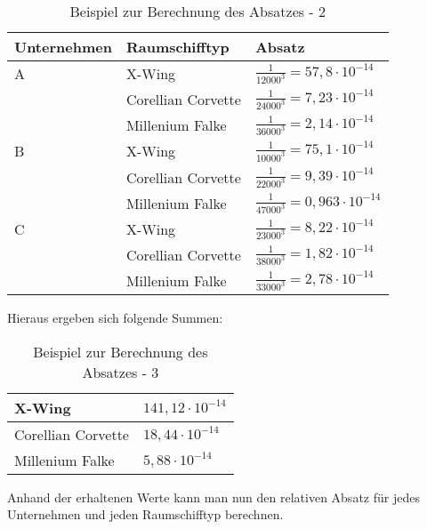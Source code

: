 \begin{table}[htb]
     \centering
     \begin{tabular}{ | l | l | l | }
          \hline
          Unternehmen & Raumschifftyp & Absatz \\
          \hline \hline
         A & X-Wing & $\frac{1}{12000^3} = 57,8 \cdot 10^{-14}$  \\
           & Corellian Corvette & $\frac{1}{24000^3} = 7,23 \cdot 10^{-14}$ \\
           & Millenium Falke & $\frac{1}{36000^3} = 2,14 \cdot 10^{-14}$ \\ \hline
         B & X-Wing & $\frac{1}{10000^3} = 75,1 \cdot 10^{-14}$ \\
           & Corellian Corvette & $\frac{1}{22000^3} = 9,39 \cdot 10^{-14}$ \\
           & Millenium Falke & $\frac{1}{47000^3} = 0,963 \cdot 10^{-14}$ \\ \hline
         C & X-Wing & $\frac{1}{23000^3} = 8,22 \cdot 10^{-14}$ \\
           & Corellian Corvette & $\frac{1}{38000^3} = 1,82 \cdot 10^{-14}$ \\
           & Millenium Falke & $\frac{1}{33000^3} = 2,78 \cdot 10^{-14}$ \\ \hline
     \end{tabular}
     \caption{Beispiel zur Berechnung des Absatzes - 2}
     \label{tab:spielwelt-logik-absatzmengen-beispiel2}
\end{table}
 
 Hieraus ergeben sich folgende Summen:
 
\begin{table}[htb]
     \centering
     \begin{tabular}{ | l | l | }
          \hline
          X-Wing & $141,12 \cdot 10^{-14}$ \\ \hline
          Corellian Corvette & $18,44 \cdot 10^{-14}$ \\ \hline
          Millenium Falke & $5,88 \cdot 10^{-14}$ \\ \hline         
     \end{tabular}
     \caption{Beispiel zur Berechnung des Absatzes - 3}
     \label{tab:spielwelt-logik-absatzmengen-beispiel3}
\end{table} 

Anhand der erhaltenen Werte kann man nun den relativen Absatz für jedes Unternehmen und jeden Raumschifftyp berechnen.

